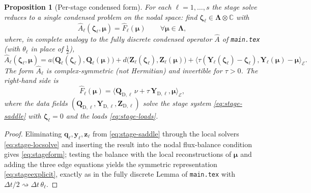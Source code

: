 \documentclass[11pt]{article}
\newtheorem{proposition}{Proposition}
\theoremstyle{remark}
\renewcommand{\vec}{\boldsymbol}
\newcommand{\bvec}[1]{\vec{#1}}
\newcommand{\setEdge}{\mathcal E}        %
\newcommand{\vLambda}{\vec\Lambda}       %
\newcommand{\C}{\mathbb{C}}
\newcommand{\kron}{\otimes}
\newcommand{\dt}{\Delta t}
\begin{document}
\begin{proposition}[Per-stage condensed form]\label{prop:perstage}
For each $\ell=1,\dots,s$ the stage solve reduces to a single condensed problem on
the nodal space: find $\vec\zeta_\ell\in\vLambda\kron\C$ with
\begin{equation}\label{eq:stageform}
  \boxed{\;\widehat A_\ell(\vec\zeta_\ell,\bvec\mu)=\widehat F_\ell(\bvec\mu)
  \qquad\forall\bvec\mu\in\vLambda,\;}
\end{equation}
where, in complete analogy to the fully discrete condensed operator $\widehat A$ of
\texttt{main.tex} (with $\theta_\ell$ in place of $\tfrac12$),
\begin{equation}\label{eq:stageexplicit}
  \widehat A_\ell(\vec\zeta_\ell,\bvec\mu)
  = a\bigl(\bvec Q_\ell(\vec\zeta_\ell),\bvec Q_\ell(\bvec\mu)\bigr)
  + d\bigl(\bvec Z_\ell(\vec\zeta_\ell),\bvec Z_\ell(\bvec\mu)\bigr)
  + \bigl\langle\tau(\bvec Y_\ell(\vec\zeta_\ell)-\vec\zeta_\ell),
      \bvec Y_\ell(\bvec\mu)-\bvec\mu\bigr\rangle_\setEdge .
\end{equation}
The form $\widehat A_\ell$ is complex-symmetric (not Hermitian) and invertible for
$\tau>0$. The right-hand side is
\begin{equation}\label{eq:stageF}
  \widehat F_\ell(\bvec\mu)
  =\langle\bvec Q_{\mathrm D,\ell}\,\nu+\tau\,\bvec Y_{\mathrm D,\ell},\bvec\mu\rangle_\setEdge,
\end{equation}
where the data fields $(\bvec Q_{\mathrm D,\ell},\bvec Y_{\mathrm D,\ell},\bvec
Z_{\mathrm D,\ell})$ solve the stage system \eqref{eq:stage-saddle} with
$\vec\zeta_\ell=0$ and the loads \eqref{eq:stage-loads}.
\end{proposition}

\begin{proof}
Eliminating $\bvec q_\ell,\bvec y_\ell,\bvec z_\ell$ from
\eqref{eq:stage-saddle} through the local solvers \eqref{eq:stage-locsolve} and
inserting the result into the nodal flux-balance condition gives
\eqref{eq:stageform}; testing the balance with the local reconstructions of
$\bvec\mu$ and adding the three edge equations yields the symmetric representation
\eqref{eq:stageexplicit}, exactly as in the fully discrete Lemma of
\texttt{main.tex} with $\dt/2\rightsquigarrow\dt\,\theta_\ell$.
\end{proof}
\end{document}
